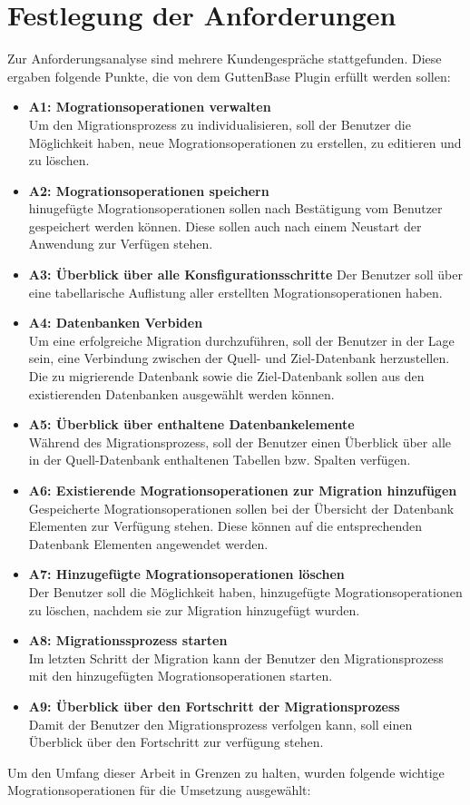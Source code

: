 \section{Festlegung der Anforderungen}
Zur Anforderungsanalyse sind mehrere Kundengespräche stattgefunden. Diese ergaben folgende Punkte, die von dem GuttenBase Plugin erfüllt werden sollen:
\begin{itemize}
	\item \textbf{A1: Mogrationsoperationen verwalten}\\
	Um den Migrationsprozess zu individualisieren, soll der Benutzer die Möglichkeit haben, neue Mogrationsoperationen zu erstellen, zu editieren und zu löschen.
	\item \textbf{A2: Mogrationsoperationen speichern} \\
	hinugefügte Mogrationsoperationen sollen nach Bestätigung vom Benutzer gespeichert werden können. Diese sollen auch nach einem Neustart der Anwendung zur Verfügen stehen.
	\item \textbf{A3: Überblick über alle Konsfigurationsschritte}
	Der Benutzer soll über eine tabellarische Auflistung aller erstellten Mogrationsoperationen haben.\\
	\item \textbf{A4: Datenbanken Verbiden} \\
	Um eine erfolgreiche Migration durchzuführen, soll der Benutzer in der Lage sein, eine Verbindung zwischen der Quell- und Ziel-Datenbank herzustellen. Die zu migrierende Datenbank sowie die Ziel-Datenbank sollen aus den existierenden Datenbanken ausgewählt werden können.
	\item \textbf{A5: Überblick über enthaltene Datenbankelemente}\\
	Während des Migrationsprozess, soll der Benutzer einen Überblick über alle in der Quell-Datenbank enthaltenen Tabellen bzw. Spalten verfügen.
	\item \textbf{A6: Existierende Mogrationsoperationen zur Migration hinzufügen}\\
	Gespeicherte Mogrationsoperationen sollen bei der Übersicht der Datenbank Elementen zur Verfügung stehen. Diese können auf die entsprechenden Datenbank Elementen angewendet werden.
	\item \textbf{A7: Hinzugefügte Mogrationsoperationen löschen}\\	
	Der Benutzer soll die Möglichkeit haben, hinzugefügte Mogrationsoperationen zu löschen, nachdem sie zur Migration hinzugefügt wurden.
	\item \textbf{A8: Migrationssprozess starten} \\
	Im letzten Schritt der Migration kann der Benutzer den Migrationsprozess mit den hinzugefügten Mogrationsoperationen starten.	
	\item \textbf{A9: Überblick über den Fortschritt der Migrationsprozess}\\
	Damit der Benutzer den Migrationsprozess verfolgen kann, soll einen Überblick über den Fortschritt zur verfügung stehen. 
\end{itemize}
Um den Umfang dieser Arbeit in Grenzen zu halten, wurden folgende wichtige Mogrationsoperationen für die Umsetzung ausgewählt:

